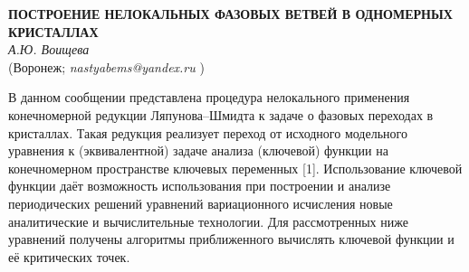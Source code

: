 \begin{center}{ \bf  ПОСТРОЕНИЕ НЕЛОКАЛЬНЫХ ФАЗОВЫХ ВЕТВЕЙ В ОДНОМЕРНЫХ КРИСТАЛЛАХ}\\
{\it А.Ю. Воищева} \\
(Воронеж; {\it nastyabems@yandex.ru} )
\end{center}

В данном сообщении представлена процедура нелокального применения
конечномерной редукции Ляпунова--Шми\-д\-та к задаче о фазовых
переходах в кристаллах. Такая редукция реализует переход от
исходного модельного уравнения к (эквивалентной) задаче анализа
(ключевой) функции на конечномерном пространстве ключевых переменных
[1]. Использование ключевой функции даёт возможность использования
при построении и анализе периодических решений уравнений
вариационного исчисления новые аналитические и вычислительные
технологии. Для рассмотренных ниже уравнений получены алгоритмы
приближенного вычислять ключевой функции и её критических точек.


